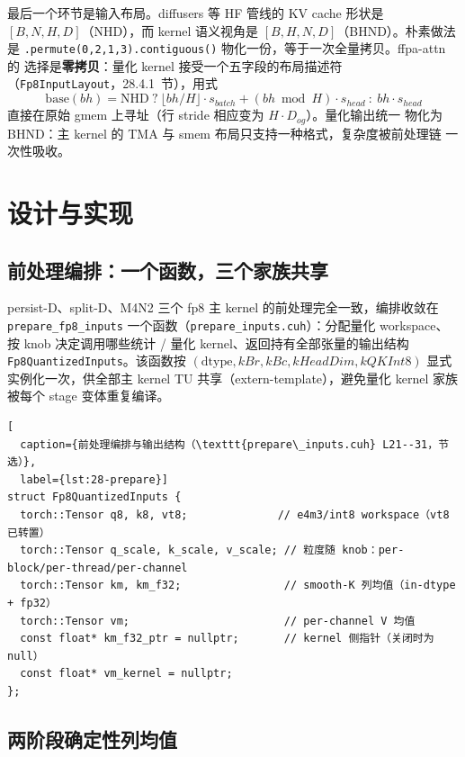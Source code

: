 最后一个环节是输入布局。diffusers 等 HF 管线的 KV cache 形状是
$[B, N, H, D]$（NHD），而 kernel 语义视角是 $[B, H, N, D]$（BHND）。朴素做法是
\texttt{.permute(0,2,1,3).contiguous()} 物化一份，等于一次全量拷贝。ffpa-attn 的
选择是\textbf{零拷贝}：量化 kernel 接受一个五字段的布局描述符
（\texttt{Fp8InputLayout}，28.4.1~节），用式
\begin{equation}
  \mathrm{base}(bh) = \mathrm{NHD}\ ?\ \lfloor bh/H\rfloor\cdot s_{batch}
  + (bh \bmod H)\cdot s_{head}\ :\ bh\cdot s_{head}
  \label{eq:28-plane-base}
\end{equation}
直接在原始 gmem 上寻址（行 stride 相应变为 $H\cdot D_{og}$）。量化输出统一
物化为 BHND：主 kernel 的 TMA 与 smem 布局只支持一种格式，复杂度被前处理链
一次性吸收。

\section{设计与实现}

\subsection{前处理编排：一个函数，三个家族共享}\label{sec:28-prepare}

persist-D、split-D、M4N2 三个 fp8 主 kernel 的前处理完全一致，编排收敛在
\texttt{prepare\_fp8\_inputs} 一个函数（\texttt{prepare\_inputs.cuh}）：分配量化
workspace、按 knob 决定调用哪些统计 / 量化 kernel、返回持有全部张量的输出结构
\texttt{Fp8QuantizedInputs}。该函数按 $(\text{dtype}, kBr, kBc, kHeadDim,
kQKInt8)$ 显式实例化一次，供全部主 kernel TU 共享（extern-template），避免量化
kernel 家族被每个 stage 变体重复编译。

\begin{lstlisting}[
  caption={前处理编排与输出结构（\texttt{prepare\_inputs.cuh} L21--31，节选）},
  label={lst:28-prepare}]
struct Fp8QuantizedInputs {
  torch::Tensor q8, k8, vt8;              // e4m3/int8 workspace（vt8 已转置）
  torch::Tensor q_scale, k_scale, v_scale; // 粒度随 knob：per-block/per-thread/per-channel
  torch::Tensor km, km_f32;                // smooth-K 列均值（in-dtype + fp32）
  torch::Tensor vm;                        // per-channel V 均值
  const float* km_f32_ptr = nullptr;       // kernel 侧指针（关闭时为 null）
  const float* vm_kernel = nullptr;
};
\end{lstlisting}

\subsection{两阶段确定性列均值}\label{sec:28-kvmean}

